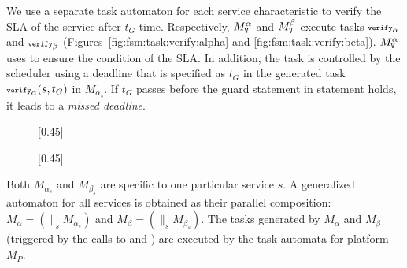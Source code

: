 We use a separate task automaton for each service characteristic to verify the SLA of the service after $t_G$ time.
Respectively, $M^{\alpha}_{{\scriptsize\texttt{V}}}$ and $M^{\beta}_{{\scriptsize\texttt{V}}}$ execute tasks ${\scriptsize\texttt{verify}}_\alpha$ and ${\scriptsize\texttt{verify}}_\beta$ (Figures~\ref{fig:fsm:task:verify:alpha} and \ref{fig:fsm:task:verify:beta}).
$M^{\alpha}_{{\scriptsize\texttt{V}}}$ uses  to ensure the condition of the SLA.
In addition, the task is controlled by the scheduler using a deadline that is specified as $t_G$ in the generated task ${\scriptsize\texttt{verify}}_\alpha(s,t_G)$ in $M_{\alpha_s}$. 
If $t_G$ passes before the guard statement in  statement holds, it leads to a \emph{missed deadline}.
\begin{figure}[h]
\captionsetup[subfigure]{font=scriptsize}
\centering
{}[0.45\textwidth]{
}%
[0.45\textwidth]{
%
}
\end{figure}

Both $M_{\alpha_s}$ and $M_{\beta_s}$ are specific to one particular service $s$.
A generalized automaton for all services is obtained as their parallel composition:$M_\alpha = (\parallel_s M_{\alpha_s})$ and $M_\beta = (\parallel_s M_{\beta_s})$.
The tasks generated by $M_\alpha$ and $M_\beta$ (triggered by the calls to
 and ) are executed by the task automata for platform $M_P$.

